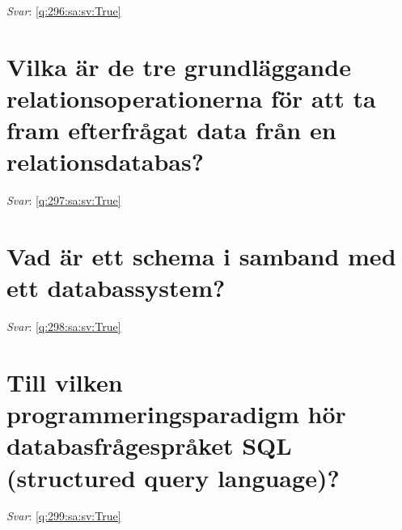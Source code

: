 \documentclass[a4paper,11pt,oneside]{book}
\begin{document}
\begin{sloppypar}
\noindent\makebox[\textwidth]{\hrulefill}

\vspace{1cm}

\textit{Svar}: \autoref{q:296:sa:sv:True}



\section{Vilka \"ar de tre grundl\"aggande relationsoperationerna f\"or att ta fram efterfr\r{a}gat data fr\r{a}n en relationsdatabas?}

\label{q:297:sa:sv:False}

\vspace{2cm}

\noindent\makebox[\textwidth]{\hrulefill}

\vspace{1cm}

\textit{Svar}: \autoref{q:297:sa:sv:True}



\section{Vad \"ar ett schema i samband med ett databassystem?}

\label{q:298:sa:sv:False}

\vspace{2cm}

\noindent\makebox[\textwidth]{\hrulefill}

\vspace{1cm}

\textit{Svar}: \autoref{q:298:sa:sv:True}



\section{Till vilken programmeringsparadigm h\"or databasfr\r{a}gespr\r{a}ket SQL (structured query language)?}

\label{q:299:sa:sv:False}

\vspace{2cm}

\noindent\makebox[\textwidth]{\hrulefill}

\vspace{1cm}

\textit{Svar}: \autoref{q:299:sa:sv:True}




\end{sloppypar}
\end{document}
